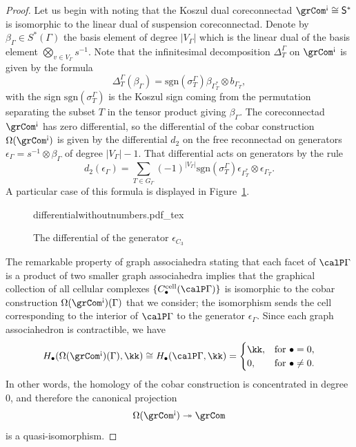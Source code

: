 \begin{proof}
Let us begin with noting that the Koszul dual coreconnectad $\grCom^{\text{!`}} \cong \mathsf{S}^*$ is isomorphic to the linear dual of suspension coreconnectad. Denote by $\beta_{\Gamma} \in S^{*}(\Gamma)$ the basis element of degree $|V_\Gamma|$ which is the linear dual of the basis element $\bigotimes_{v\in V_\Gamma}s^{-1}$. Note that the infinitesimal decomposition $\Delta^\Gamma_T$ on $\grCom^{\text{!`}}$ is given by the formula
 \[
\Delta^\Gamma_T(\beta_{\Gamma})=\mathrm{sgn}(\sigma_T^{\Gamma})\beta_{\Gamma^*_T}\otimes b_{\Gamma_T},
 \] 
with the sign $\mathrm{sgn}(\sigma_T^{\Gamma})$ is the Koszul sign coming from the permutation separating the subset $T$ in the tensor product giving $\beta_{\Gamma}$. The coreconnectad $\grCom^{\text{!`}}$ has zero differential, so the differential of the cobar construction $\Omega(\grCom^{\text{!`}})$ is given by the differential $d_2$ on the free reconnectad on generators $\epsilon_{\Gamma}=s^{-1}\otimes \beta_{\Gamma}$ of degree $|V_\Gamma|-1$. That differential acts on generators by the rule
 \[
d_2(\epsilon_{\Gamma})=\sum_{T\in G_\Gamma}(-1)^{|V_\Gamma|}\mathrm{sgn}(\sigma_T^{\Gamma})\epsilon_{\Gamma^*_T}\otimes \epsilon_{\Gamma_T}.
 \]
A particular case of this formula is displayed in Figure~\ref{fig:differential}. 
\begin{figure}[ht]
    \centering
    \def\svgwidth{\columnwidth}
    {differentialwithoutnumbers.pdf_tex}
   \caption{The differential of the generator $\epsilon_{C_3}$}
   \label{fig:differential} 
\end{figure}

The remarkable property of graph associahedra stating that each facet of $\calP\Gamma$ is a product of two smaller graph associahedra \cite[Th.~2.9]{MR2239078} implies that the graphical collection of all cellular complexes $\{C^{\mathrm{cell}}_\bullet(\calP\Gamma)\}$ is isomorphic to the cobar construction
$\Omega(\grCom^{\text{!`}})(\Gamma)$ that we consider; the isomorphism sends the cell corresponding to the interior of $\calP\Gamma$ to the generator $\epsilon_{\Gamma}$. Since each graph associahedron is contractible, we have
 \[
H_{\bullet}(\Omega(\grCom^{\text{!`}})(\Gamma),\kk) \cong H_{\bullet}(\calP\Gamma,\kk)=
\begin{cases}
 \kk, & \text{for } \bullet=0,\\
   0, & \text{for } \bullet \neq 0.
     \end{cases}
 \]
In other words, the homology of the cobar construction is concentrated in degree $0$, and therefore the canonical projection 
 \[
\Omega(\grCom^{\text{!`}})\twoheadrightarrow\grCom
 \]
is a quasi-isomorphism.
\end{proof}

